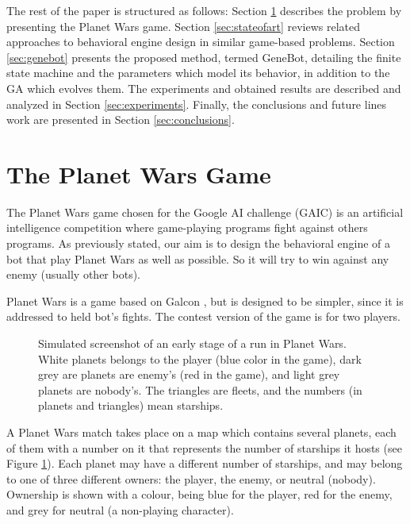 \documentclass{llncs}
\begin{document}
The rest of the paper is structured as follows: 
Section \ref{sec:planet_wars} describes the problem by presenting the Planet Wars game. 
Section \ref{sec:stateofart} reviews related approaches to behavioral engine design in similar game-based problems.
Section \ref{sec:genebot} presents the proposed method, termed {GeneBot}, detailing the finite state machine and the parameters which model its behavior, in addition to the GA which evolves them.
The experiments and obtained results are described and analyzed in Section \ref{sec:experiments}.
Finally, the conclusions and future lines work are presented in Section \ref{sec:conclusions}.

\section{The Planet Wars Game}
\label{sec:planet_wars}

The Planet Wars game chosen for the Google AI challenge (GAIC) \cite{webGAIC}
is an artificial intelligence competition where game-playing programs
fight against others programs. As previously stated, our aim is to
design the behavioral engine of a bot that play Planet Wars as well as possible. So it
will try to win against any enemy (usually other bots). 

Planet Wars is a game based on Galcon \cite{wiki:galcon}, but is designed to be simpler, since it is addressed to held bot's fights. The contest version of the game is for two players.

\begin{figure}[ht]
\begin{center}
\end{center}
\caption{Simulated screenshot of an early stage of a run in Planet Wars. White planets belongs to the player (blue color in the game), dark grey are planets are enemy's (red in the game), and light grey planets are nobody's. The triangles are fleets, and the numbers (in planets and triangles) mean starships.}
\label{figura:PlanetWars1}
\end{figure}

A Planet Wars match takes place on a map which contains several
planets, each of them with a number on it that represents the number
of starships it hosts (see Figure \ref{figura:PlanetWars1}). Each
planet may have a different number of starships, and may belong to one
of three different owners: the player, the enemy, or neutral
(nobody). Ownership is shown with a colour, being blue for the
player, red for the enemy, and grey for neutral (a non-playing character). 
\end{document}
